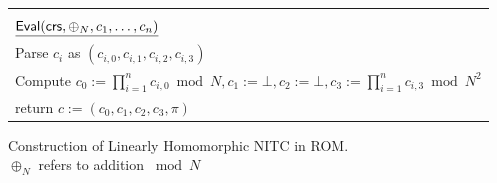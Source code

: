 \begin{figure}[h!]
\begin{center}
\begin{tabular}{|ll|}
                                             &\\
$\underline{\mathsf{Eval}(\mathsf{crs},\oplus_N, c_1, \dots, c_n)}$ &  \\
Parse $c_i$ as $(c_{i,0}, c_{i,1}, c_{i,2}, c_{i,3})$ & \\
\multicolumn{2}{|l|}{Compute $c_0 := \prod_{i=1}^n c_{i,0} \bmod N, c_1:= \bot, c_2:=\bot, c_3 := \prod_{i=1}^n c_{i,3} \bmod N^2$} \\
return $c := (c_0, c_1, c_2, c_3, \pi)$ & \\
\hline          
\end{tabular}
\caption{Construction of Linearly Homomorphic NITC in ROM. \\ $\oplus_N$ refers to addition $\bmod N$}
\label{table:nitc-lh-rom}
\end{center}
\end{figure}

